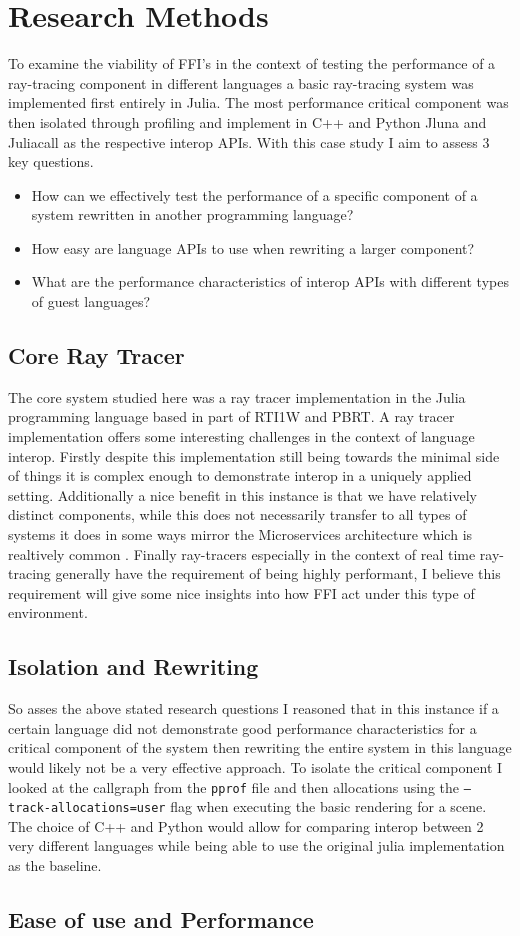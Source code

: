 \section{Research Methods}\label{s:method}

To examine the viability of FFI's in the context of testing the performance of a ray-tracing component in different languages a basic ray-tracing system was implemented first entirely in Julia. The most performance critical component was then isolated through profiling and implement in C++ and Python Jluna and Juliacall as the respective interop APIs. With this case study I aim to assess 3 key questions.
\begin{itemize}
    \item How can we effectively test the performance of a specific component of a system rewritten in another programming language?
    \item How easy are language APIs to use when rewriting a larger component?
    \item What are the performance characteristics of interop APIs with different types of guest languages? 
\end{itemize}

\subsection{Core Ray Tracer}
The core system studied here was a ray tracer implementation in the Julia programming language based in part of RTI1W and PBRT. A ray tracer implementation offers some interesting challenges in the context of language interop. Firstly despite this implementation still being towards the minimal side of things it is complex enough to demonstrate interop in a uniquely applied setting. Additionally a nice benefit in this instance is that we have relatively distinct components, while this does not necessarily transfer to all types of systems it does in some ways mirror the Microservices architecture which is realtively common 
.
Finally ray-tracers especially in the context of real time ray-tracing generally have the requirement of being highly performant, I believe this requirement will give some nice insights into how FFI act under this type of environment.

\subsection{Isolation and Rewriting}
So asses the above stated research questions I reasoned that in this instance if a certain language did not demonstrate good performance characteristics for a critical component of the system then rewriting the entire system in this language would likely not be a very effective approach. To isolate the critical component I looked at the callgraph from the \texttt{pprof} file and then allocations using the \texttt{--track-allocations=user} flag when executing the basic rendering for a scene. The choice of C++ and Python would allow for comparing interop between 2 very different languages while being able to use the original julia implementation as the baseline.

\subsection{Ease of use and Performance}

 